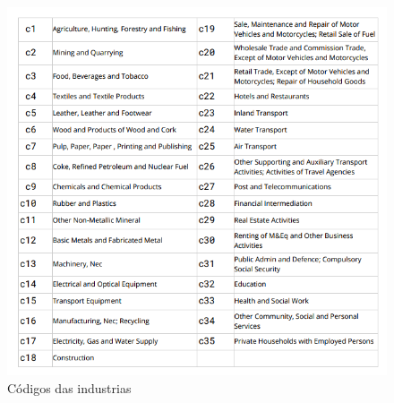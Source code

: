 \documentclass[12pt]{article}
\begin{document}
\begin{figure}[H]
	\centering
	\includegraphics[width=\textwidth]{tabela_industrias.png}
	\caption{Códigos das industrias}
	\label{figura4}
\end{figure}

{}


\end{document}
